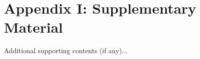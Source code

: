 \chapter{Appendix I: Supplementary Material}\label{AppendixA}
Additional supporting contents (if any)...